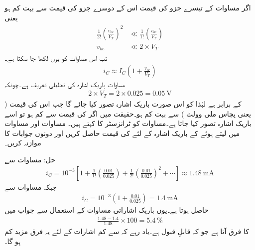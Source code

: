 اگر مساوات   کے تیسرے جزو کی قیمت اس کے دوسرے جزو کی قیمت سے بہت کم ہو یعنی
\begin{gather} \label{مساوات_ٹرانزسٹر_باریک_اشارہ_کی_تحلیلی_تعریف}
\begin{aligned}
\frac{1}{2!} \left(\frac{v_{be}}{V_T} \right )^2 & \ll \frac{1}{1!} \left(\frac{v_{be}}{V_T} \right )\\
v_{be}  & \ll 2 \times V_T
\end{aligned}
\end{gather}
تب اس مساوات کو یوں لکھا جا سکتا ہے۔
\begin{align} \label{مساوات_ٹرانزسٹر_کی_باریک_اشاراتی_مساوات}
i_C \approx I_C \left (1+\frac{v_{be}}{V_T} \right )
\end{align}
مساوات   باریک اشارہ  کی تحلیلی تعریف ہے۔چونکہ
\begin{align*}
2 \times V_T = 2 \times 0.025 =\SI{0.05}{\volt}
\end{align*}
کے برابر ہے لہٰذا  کو اس صورت باریک اشارہ تصور کیا جائے گا جب اس کی قیمت    ( یعنی پچاس ملی وولٹ ) سے بہت کم ہو۔حقیقت میں اگر   کی قیمت  سے کم ہو تو اسے باریک اشارہ تصور کیا جاتا ہے۔مساوات   کو ٹرانزسٹر کا  کہتے ہیں۔
مساوات   اور مساوات   میں   لیتے ہوئے  کے باریک اشارہ کے لئے  کی قیمت حاصل کریں اور دونوں جوابات کا موازنہ کریں۔

حل:	مساوات   سے
\begin{align*}
i_C=10^{-3} \left [1+\frac{1}{1!} \left(\frac{0.01}{0.025}\right)  +\frac{1}{2!} \left( \frac{0.01}{0.025} \right)^2   +\cdots \right ] \approx \SI{1.48}{\milli \ampere}
\end{align*}
جبکہ مساوات   سے
\begin{align*}
i_C=10^{-3} \left(1+\frac{0.01}{0.025} \right )=\SI{1.4}{\milli \ampere}
\end{align*}
حاصل ہوتا ہے۔یوں باریک اشاراتی مساوات کے استعمال سے جواب میں
\begin{align*}
\frac{1.48-1.4}{1.48} \times 100=\SI{5.4}{\percent}
\end{align*}
کا فرق آتا ہے جو کہ قابلِ قبول ہے۔یاد رہے کہ  سے کم اشارات کے لئے یہ فرق مزید کم ہو گا۔

